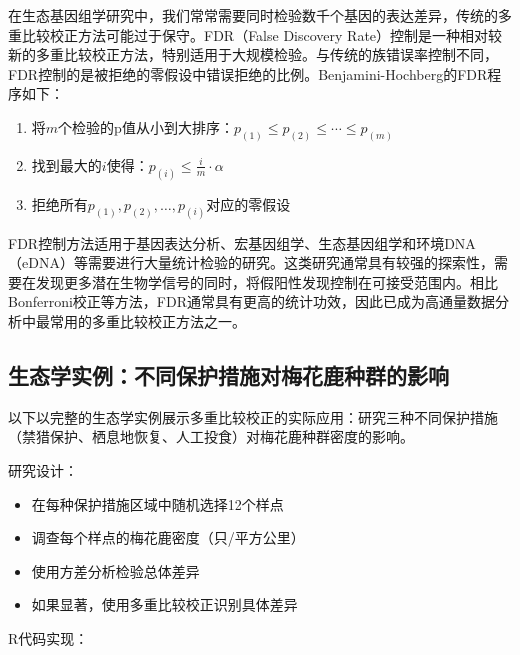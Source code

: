 \documentclass[
  twoside,12pt,fontset=none]{ctexbook}
\providecommand{\tightlist}{%
  \setlength{\itemsep}{0pt}\setlength{\parskip}{0pt}}
\begin{document}
在生态基因组学研究中，我们常常需要同时检验数千个基因的表达差异，传统的多重比较校正方法可能过于保守。FDR（False Discovery Rate）控制是一种相对较新的多重比较校正方法，特别适用于大规模检验。与传统的族错误率控制不同，FDR控制的是被拒绝的零假设中错误拒绝的比例。Benjamini-Hochberg的FDR程序如下：

\begin{enumerate}
\def\labelenumi{\arabic{enumi}.}
\tightlist
\item
  将\(m\)个检验的p值从小到大排序：\(p_{(1)} \leq p_{(2)} \leq \cdots \leq p_{(m)}\)
\item
  找到最大的\(i\)使得：\(p_{(i)} \leq \frac{i}{m} \cdot \alpha\)
\item
  拒绝所有\(p_{(1)}, p_{(2)}, \ldots, p_{(i)}\)对应的零假设
\end{enumerate}

FDR控制方法适用于基因表达分析、宏基因组学、生态基因组学和环境DNA（eDNA）等需要进行大量统计检验的研究。这类研究通常具有较强的探索性，需要在发现更多潜在生物学信号的同时，将假阳性发现控制在可接受范围内。相比Bonferroni校正等方法，FDR通常具有更高的统计功效，因此已成为高通量数据分析中最常用的多重比较校正方法之一。

\hypertarget{ux751fux6001ux5b66ux5b9eux4f8bux4e0dux540cux4fddux62a4ux63aaux65bdux5bf9ux6885ux82b1ux9e7fux79cdux7fa4ux7684ux5f71ux54cd}{%
\subsection{生态学实例：不同保护措施对梅花鹿种群的影响}\label{ux751fux6001ux5b66ux5b9eux4f8bux4e0dux540cux4fddux62a4ux63aaux65bdux5bf9ux6885ux82b1ux9e7fux79cdux7fa4ux7684ux5f71ux54cd}}

以下以完整的生态学实例展示多重比较校正的实际应用：研究三种不同保护措施（禁猎保护、栖息地恢复、人工投食）对梅花鹿种群密度的影响。

研究设计：

\begin{itemize}
\tightlist
\item
  在每种保护措施区域中随机选择12个样点
\item
  调查每个样点的梅花鹿密度（只/平方公里）
\item
  使用方差分析检验总体差异
\item
  如果显著，使用多重比较校正识别具体差异
\end{itemize}

R代码实现：
\end{document}
